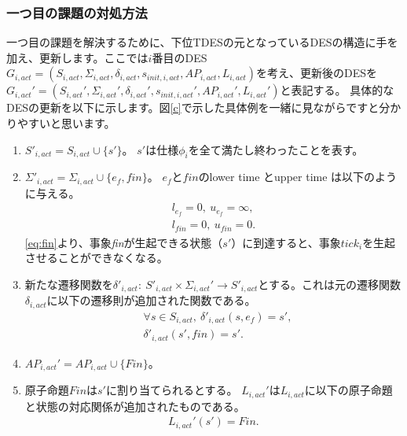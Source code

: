 \documentclass[ 10pt]{jsarticle}
\newcommand{\req}[1]{\eqref{#1}}
\begin{document}
\subsubsection{一つ目の課題の対処方法}
一つ目の課題を解決するために、下位TDESの元となっているDESの構造に手を加え、更新します。ここでは$i$番目のDES $G_{i,\textit{act}}=(S_{i,\textit{act}},\Sigma_{i,\textit{act}},\delta_{i,\textit{act}},s_{\textit{init},i,\textit{act}},\textit{AP}_{i,\textit{act}},L_{i,\textit{act}})$を考え、更新後のDESを$G_{i,\textit{act}}'=(S_{i,\textit{act}}',\Sigma_{i,\textit{act}}',\delta_{i,\textit{act}}',s_{\textit{init},i,\textit{act}}',\textit{AP}_{i,\textit{act}}',L_{i,\textit{act}}')$と表記する。
具体的なDESの更新を以下に示します。図\ref{c}で示した具体例を一緒に見ながらですと分かりやすいと思います。
%
\begin{enumerate}
\item
$S'_{i,\textit{act}}=S_{i,\textit{act}}\cup\{s'\}$。
$s'$は仕様$\phi_i$を全て満たし終わったことを表す。
\item
$\Sigma'_{i,\textit{act}}=\Sigma_{i,\textit{act}}\cup\{e_f,\textit{fin}\}$。
$e_f$と$\textit{fin}$のlower time とupper time は以下のように与える。
\begin{align}
l_{e_f}=0,\ u_{e_f}=\infty,\\
l_{\textit{fin}}=0,\ u_{\textit{fin}}=0.\label{eq:fin}
\end{align}
\req{eq:fin}より、事象\textit{fin}が生起できる状態（$s'$）に到達すると、事象$\textit{tick}_i$を生起させることができなくなる。
\item
新たな遷移関数を$\delta'_{i,act}:~S'_{i,\textit{act}}\times \Sigma_{i,\textit{act}}'\to S'_{i,\textit{act}}$とする。これは元の遷移関数$\delta_{i,act}$に以下の遷移則が追加された関数である。
\begin{align}
&\forall s\in S_{i,\textit{act}}, ~\delta'_{i,act}(s,e_f)=s',\\
&\delta'_{i,act}(s',\textit{fin})=s'.\label{delta:fin}
\end{align}
\item
$\textit{AP}_{i,\textit{act}}'=\textit{AP}_{i,\textit{act}}\cup\{\textit{Fin}\}$。
\item
原子命題$\textit{Fin}$は$s'$に割り当てられるとする。
$L_{i,\textit{act}}'$は$L_{i,\textit{act}}$に以下の原子命題と状態の対応関係が追加されたものである。
\begin{align}
L_{i,\textit{act}}'(s')=\textit{Fin}.
\end{align}
%
\end{enumerate}
\end{document}
